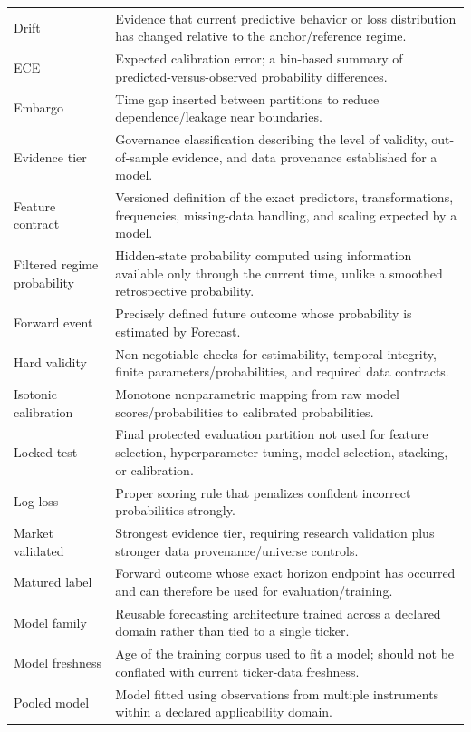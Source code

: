 \documentclass[11pt]{article}
\begin{document}
\begin{longtable}{p{}p{}}
Drift & Evidence that current predictive behavior or loss distribution has changed relative to the anchor/reference regime.\\
ECE & Expected calibration error; a bin-based summary of predicted-versus-observed probability differences.\\
Embargo & Time gap inserted between partitions to reduce dependence/leakage near boundaries.\\
Evidence tier & Governance classification describing the level of validity, out-of-sample evidence, and data provenance established for a model.\\
Feature contract & Versioned definition of the exact predictors, transformations, frequencies, missing-data handling, and scaling expected by a model.\\
Filtered regime probability & Hidden-state probability computed using information available only through the current time, unlike a smoothed retrospective probability.\\
Forward event & Precisely defined future outcome whose probability is estimated by Forecast.\\
Hard validity & Non-negotiable checks for estimability, temporal integrity, finite parameters/probabilities, and required data contracts.\\
Isotonic calibration & Monotone nonparametric mapping from raw model scores/probabilities to calibrated probabilities.\\
Locked test & Final protected evaluation partition not used for feature selection, hyperparameter tuning, model selection, stacking, or calibration.\\
Log loss & Proper scoring rule that penalizes confident incorrect probabilities strongly.\\
Market validated & Strongest evidence tier, requiring research validation plus stronger data provenance/universe controls.\\
Matured label & Forward outcome whose exact horizon endpoint has occurred and can therefore be used for evaluation/training.\\
Model family & Reusable forecasting architecture trained across a declared domain rather than tied to a single ticker.\\
Model freshness & Age of the training corpus used to fit a model; should not be conflated with current ticker-data freshness.\\
Pooled model & Model fitted using observations from multiple instruments within a declared applicability domain.\\

\end{longtable}
\end{document}

